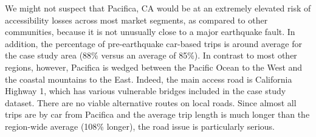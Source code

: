 

We might not suspect that Pacifica, CA would be at an extremely elevated risk of accessibility losses across most market segments, as compared to other communities, because it is not unusually close to a major earthquake fault. In addition, the percentage of pre-earthquake car-based trips is around average for the case study area (88\% versus an average of 85\%). 
In contrast to most other regions, however, Pacifica is wedged between the Pacific Ocean to the West and the coastal mountains to the East. Indeed, the main access road is California Highway 1, which has various vulnerable bridges included in the case study dataset. There are no viable alternative routes on local roads. Since almost all trips are by car from Pacifica and the average trip length is much longer than the region-wide average (108\% longer), the road issue is particularly serious.

